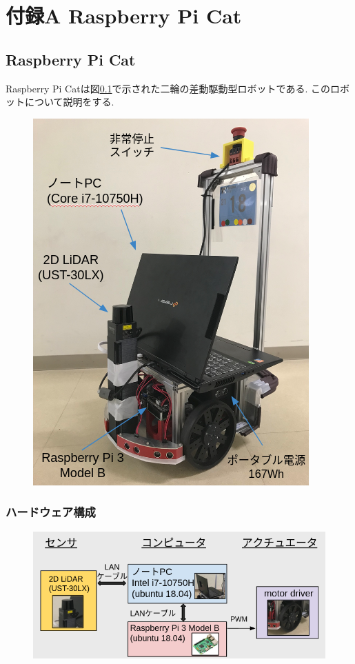 \chapter*{付録A Raspberry Pi Cat}

\section{Raspberry Pi Cat}
Raspberry Pi Catは図\ref{fig:raspicat}で示された二輪の差動駆動型ロボットである.
このロボットについて説明をする.
\begin{figure}[H]
	\begin{center}
		\includegraphics[width=0.5\linewidth]{figs/raspicat.png}
		\caption{}
		\label{fig:raspicat}
	\end{center}
\end{figure}

\subsection{ハードウェア構成}
\begin{figure}[H]
	\begin{center}
		\includegraphics[width=1.0\linewidth]{figs/raspicat-hardware-config.png}
		\caption{}
		\label{fig:raspicat-hardware-config}
	\end{center}
\end{figure}

